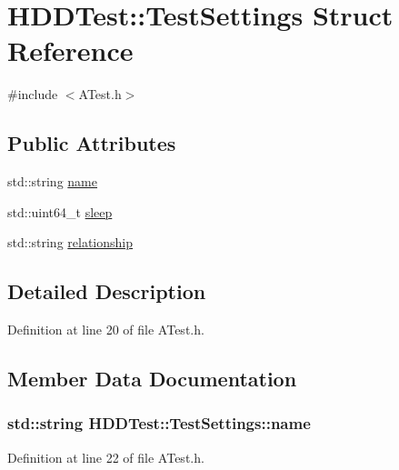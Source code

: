 \hypertarget{struct_h_d_d_test_1_1_test_settings}{\section{H\-D\-D\-Test\-:\-:Test\-Settings Struct Reference}
\label{struct_h_d_d_test_1_1_test_settings}
}


{\ttfamily \#include $<$A\-Test.\-h$>$}

\subsection*{Public Attributes}
\begin{DoxyCompactItemize}
\item 
std\-::string \hyperlink{struct_h_d_d_test_1_1_test_settings_acb1acd81644b7dc295e3cfd187469cb9}{name}
\item 
std\-::uint64\-\_\-t \hyperlink{struct_h_d_d_test_1_1_test_settings_a689e6ed46e39f14544a7f257c506d9b9}{sleep}
\item 
std\-::string \hyperlink{struct_h_d_d_test_1_1_test_settings_a2ae4bf77f3d9d63cc28ac44622327d23}{relationship}
\end{DoxyCompactItemize}


\subsection{Detailed Description}


Definition at line 20 of file A\-Test.\-h.



\subsection{Member Data Documentation}
\hypertarget{struct_h_d_d_test_1_1_test_settings_acb1acd81644b7dc295e3cfd187469cb9}{
\subsubsection[{name}]{\setlength{\rightskip}{0pt plus 5cm}std\-::string H\-D\-D\-Test\-::\-Test\-Settings\-::name}}\label{struct_h_d_d_test_1_1_test_settings_acb1acd81644b7dc295e3cfd187469cb9}


Definition at line 22 of file A\-Test.\-h.

